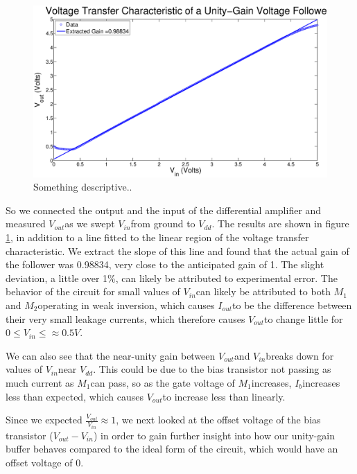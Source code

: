 \documentclass{article}
\newcommand{\Vout}{{$V_{out}$}}
\newcommand{\Vdd}{{$V_{dd}$}}
\newcommand{\Iout}{{$I_{out}$}}
\newcommand{\Vin}{{$V_{in}$}}
\newcommand{\Ib}{{$I_{b}$}}
\newcommand{\Mone}{{$M_{1}$}}
\newcommand{\Mtwo}{{$M_{2}$}}
\begin{document}
\begin{figure}[H]
\centering
\includegraphics[width=\linewidth]{../Figures/Exp3P1.eps}
\caption{Something descriptive..}
\label{fig:exp3p1}
\end{figure}

So we connected the output and the input of the differential amplifier and measured \Vout as we swept \Vin from ground to \Vdd. The results are shown in figure \ref{fig:exp3p1}, in addition to a line fitted to the linear region of the voltage transfer characteristic. We extract the slope of this line and found that the actual gain of the follower was 0.98834, very close to the anticipated gain of 1. The slight deviation, a little over 1\%, can likely be attributed to experimental error. The behavior of the circuit for small values of \Vin can likely be attributed to both \Mone and \Mtwo operating in weak inversion, which causes \Iout to be the difference between their very small leakage currents, which therefore causes \Vout to change little for $0 \leq V_{in} \leq \approx 0.5 V.$

We can also see that the near-unity gain between \Vout and \Vin breaks down for values of \Vin near \Vdd. This could be due to the bias transistor not passing as much current as \Mone can pass, so as the gate voltage of \Mone increases, \Ib increases less than expected, which causes \Vout to increase less than linearly.

Since we expected $\frac{V_{out}}{V_{in}} \approx 1$, we next looked at the offset voltage of the bias transistor ($V_{out} - V_{in}$) in order to gain further insight into how our unity-gain buffer behaves compared to the ideal form of the circuit, which would have an offset voltage of 0.
\end{document}
